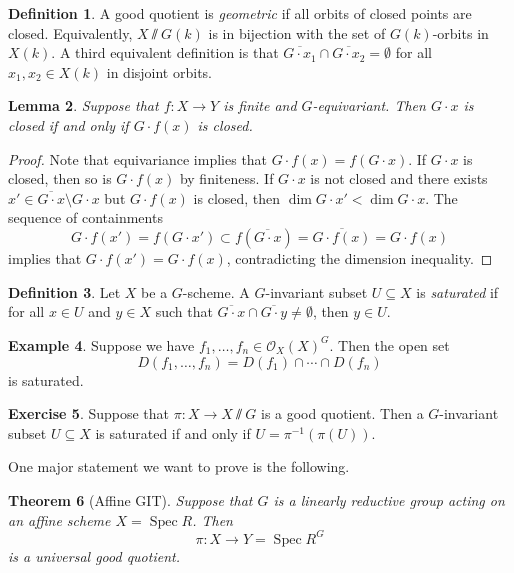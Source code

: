 \documentclass{amsart}
\newtheorem{thm}{Theorem}[section]
\newtheorem{lem}[thm]{Lemma}
\theoremstyle{definition}
\newtheorem{defn}[thm]{Definition}
\newtheorem{exm}[thm]{Example}
\newtheorem{exer}[thm]{Exercise}
\theoremstyle{remark}
\theoremstyle{plain}
\theoremstyle{definition}
\theoremstyle{remark}
\newcommand{\mc}[1]{\mathcal{#1}}
\newcommand{\ol}[1]{\overline{#1}}
\newcommand{\1}{\mathbf{1}}
\newcommand{\2}{\mathbf{2}}
\newcommand{\3}{\mathbf{3}}
\DeclareMathOperator{\Spec}{Spec}
\begin{document}
\begin{defn}
    A good quotient is \textit{geometric} if all orbits of closed points are closed. Equivalently, \(X \sslash G (k)\) is in bijection with the set of \(G(k)\)-orbits in \(X(k)\). A third equivalent definition is that \(\ol{G \cdot x_1} \cap \ol{G \cdot x_2} = \emptyset\) for all \(x_1, x_2 \in X(k)\) in disjoint orbits.
\end{defn}

\begin{lem}
    Suppose that \(f \colon X \to Y\) is finite and \(G\)-equivariant. Then \(G \cdot x\) is closed if and only if \(G \cdot f(x)\) is closed.
\end{lem}

\begin{proof}
    Note that equivariance implies that \(G \cdot f(x) = f(G \cdot x)\). If \(G \cdot x\) is closed, then so is \(G \cdot f(x)\) by finiteness. If \(G \cdot x\) is not closed and there exists \(x' \in \ol{G \cdot x} \setminus G \cdot x\) but \(G \cdot f(x)\) is closed, then \(\dim G \cdot x' < \dim G \cdot x\). The sequence of containments
    \[ G \cdot f(x') = f(G \cdot x') \subset f (\ol{G \cdot x}) = \ol{G \cdot f(x)} = G \cdot f(x) \]
    implies that \(G \cdot f(x') = G \cdot f(x)\), contradicting the dimension inequality.
\end{proof}


\begin{defn}
    Let \(X\) be a \(G\)-scheme. A $G$-invariant subset \(U \subseteq X\) is \textit{saturated} if for all \(x \in U\) and \(y \in X\) such that \(\ol{G \cdot x} \cap \ol{G \cdot y} \neq \emptyset\), then \(y \in U\).
\end{defn}

\begin{exm}
    Suppose we have \(f_1, \ldots, f_n \in \mc{O}_X(X)^G\). Then the open set
    \[ D(f_1, \ldots, f_n) = D(f_1) \cap \cdots \cap D(f_n) \]
    is saturated.
\end{exm}

\begin{exer}
    Suppose that \(\pi \colon X \to X \sslash G\) is a good quotient. Then a \(G\)-invariant subset \(U \subseteq X\) is saturated if and only if \(U = \pi^{-1} (\pi(U))\). 
\end{exer}

One major statement we want to prove is the following.

\begin{thm}[Affine GIT]\label{thm:affine-git}
    Suppose that \(G\) is a linearly reductive group acting on an affine scheme \(X = \Spec R\). Then
    \[ \pi \colon X \to Y = \Spec R^G \]
    is a universal good quotient.
\end{thm}
\end{document}
